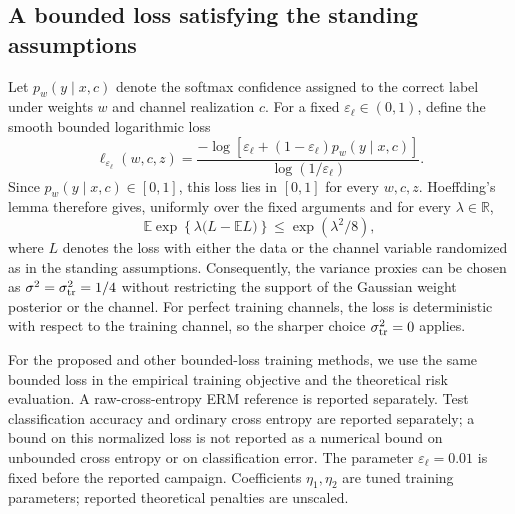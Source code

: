 \subsection{A bounded loss satisfying the standing assumptions}
Let $p_w(y\mid x,c)$ denote the softmax confidence assigned to the correct
label under weights $w$ and channel realization $c$. For a fixed
$\varepsilon_{\ell}\in(0,1)$, define the smooth bounded logarithmic loss
\begin{equation}
  \ell_{\varepsilon_{\ell}}(w,c,z)
  = \frac{-\log\!\left[\varepsilon_{\ell}
      +(1-\varepsilon_{\ell})p_w(y\mid x,c)\right]}
    {\log(1/\varepsilon_{\ell})}.
\end{equation}
Since $p_w(y\mid x,c)\in[0,1]$, this loss lies in $[0,1]$ for every
$w,c,z$. Hoeffding's lemma therefore gives, uniformly over the fixed
arguments and for every $\lambda\in\mathbb R$,
\begin{equation}
  \mathbb E\exp\!\left\{\lambda\bigl(L-\mathbb EL\bigr)\right\}
  \leq \exp(\lambda^2/8),
\end{equation}
where $L$ denotes the loss with either the data or the channel variable
randomized as in the standing assumptions. Consequently, the variance
proxies can be chosen as $\sigma^2=\sigma_{\rm tr}^2=1/4$ without
restricting the support of the Gaussian weight posterior or the channel.
For perfect training channels, the loss is deterministic with respect to
the training channel, so the sharper choice $\sigma_{\rm tr}^2=0$ applies.

For the proposed and other bounded-loss training methods, we use the same
bounded loss in the empirical training objective and the theoretical risk
evaluation. A raw-cross-entropy ERM reference is reported separately.
Test classification accuracy and ordinary
cross entropy are reported separately; a bound on this normalized loss is
not reported as a numerical bound on unbounded cross entropy or on
classification error. The parameter $\varepsilon_{\ell}=0.01$ is fixed
before the reported campaign. Coefficients $\eta_1,\eta_2$ are tuned
training parameters; reported theoretical penalties are unscaled.

